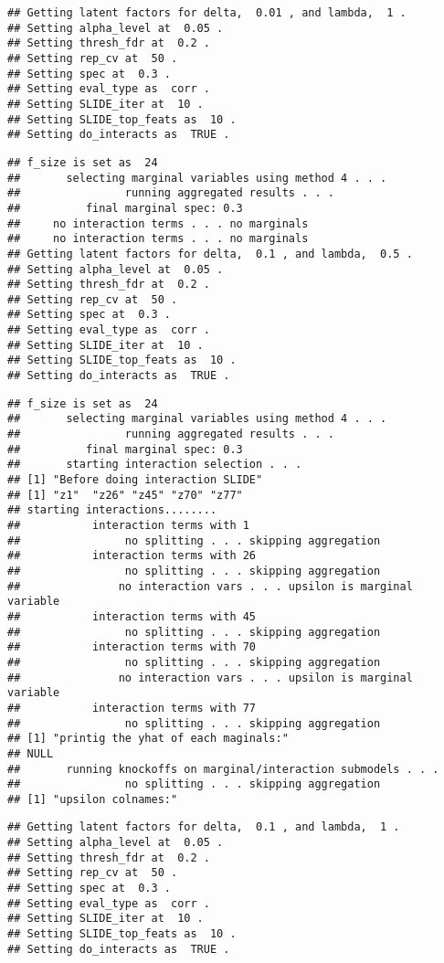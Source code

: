 \documentclass[
]{article}
\begin{document}
\begin{verbatim}
## Getting latent factors for delta,  0.01 , and lambda,  1 . 
## Setting alpha_level at  0.05 .
## Setting thresh_fdr at  0.2 .
## Setting rep_cv at  50 .
## Setting spec at  0.3 .
## Setting eval_type as  corr .
## Setting SLIDE_iter at  10 .
## Setting SLIDE_top_feats as  10 .
## Setting do_interacts as  TRUE .
\end{verbatim}

\begin{verbatim}
## f_size is set as  24 
##       selecting marginal variables using method 4 . . . 
##                running aggregated results . . . 
##          final marginal spec: 0.3
##     no interaction terms . . . no marginals 
##     no interaction terms . . . no marginals 
## Getting latent factors for delta,  0.1 , and lambda,  0.5 . 
## Setting alpha_level at  0.05 .
## Setting thresh_fdr at  0.2 .
## Setting rep_cv at  50 .
## Setting spec at  0.3 .
## Setting eval_type as  corr .
## Setting SLIDE_iter at  10 .
## Setting SLIDE_top_feats as  10 .
## Setting do_interacts as  TRUE .
\end{verbatim}

\begin{verbatim}
## f_size is set as  24 
##       selecting marginal variables using method 4 . . . 
##                running aggregated results . . . 
##          final marginal spec: 0.3
##       starting interaction selection . . . 
## [1] "Before doing interaction SLIDE"
## [1] "z1"  "z26" "z45" "z70" "z77"
## starting interactions........ 
##           interaction terms with 1 
##                no splitting . . . skipping aggregation 
##           interaction terms with 26 
##                no splitting . . . skipping aggregation 
##               no interaction vars . . . upsilon is marginal variable 
##           interaction terms with 45 
##                no splitting . . . skipping aggregation 
##           interaction terms with 70 
##                no splitting . . . skipping aggregation 
##               no interaction vars . . . upsilon is marginal variable 
##           interaction terms with 77 
##                no splitting . . . skipping aggregation 
## [1] "printig the yhat of each maginals:"
## NULL
##       running knockoffs on marginal/interaction submodels . . . 
##                no splitting . . . skipping aggregation 
## [1] "upsilon colnames:"
\end{verbatim}

\begin{verbatim}
## Getting latent factors for delta,  0.1 , and lambda,  1 . 
## Setting alpha_level at  0.05 .
## Setting thresh_fdr at  0.2 .
## Setting rep_cv at  50 .
## Setting spec at  0.3 .
## Setting eval_type as  corr .
## Setting SLIDE_iter at  10 .
## Setting SLIDE_top_feats as  10 .
## Setting do_interacts as  TRUE .
\end{verbatim}
\end{document}
